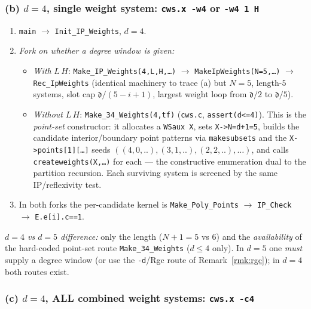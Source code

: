 \documentclass{amsart}
\begin{document}
\subsubsection*{(b) $d=4$, single weight system: \texttt{cws.x -w4} or \texttt{-w4 1 H}}

\begin{enumerate}
  \item \texttt{main} $\to$ \texttt{Init\_IP\_Weights}, $d=4$.
  \item \emph{Fork on whether a degree window is given:}
  \begin{itemize}
    \item \emph{With} $L\,H$: \texttt{Make\_IP\_Weights(4,L,H,\dots)} $\to$
          \texttt{MakeIpWeights(N=5,\dots)} $\to$ \texttt{Rec\_IpWeights}
          (identical machinery to trace (a) but $N=5$, length-$5$ systems,
          slot cap $\mathfrak d/(5-i+1)$, largest weight loop from
          $\mathfrak d/2$ to $\mathfrak d/5$).
    \item \emph{Without} $L\,H$: \texttt{Make\_34\_Weights(4,tf)}
          (\texttt{cws.c}, \texttt{assert(d<=4)}). This is the
          \emph{point-set} constructor: it allocates a \texttt{WSaux X},
          sets \texttt{X->N=d+1=5}, builds the candidate interior/boundary
          point patterns via \texttt{makesubsets} and the
          \texttt{X->points[1][\dots]} seeds $((4,0,..),(3,1,..),(2,2,..),\dots)$,
          and calls \texttt{createweights(X,\dots)} for each --- the
          constructive enumeration dual to the partition recursion. Each
          surviving system is screened by the same IP/reflexivity test.
  \end{itemize}
  \item In both forks the per-candidate kernel is \texttt{Make\_Poly\_Points}
        $\to$ \texttt{IP\_Check} $\to$ \texttt{E.e[i].c==1}.
\end{enumerate}
\emph{$d=4$ vs $d=5$ difference:} only the length ($N{+}1=5$ vs $6$) and the
\emph{availability} of the hard-coded point-set route \texttt{Make\_34\_Weights}
($d\le 4$ only). In $d=5$ one \emph{must} supply a degree window (or use the
\texttt{-d}/Rgc route of Remark~\ref{rmk:rgc}); in $d=4$ both routes exist.

\subsubsection*{(c) $d=4$, ALL combined weight systems: \texttt{cws.x -c4}}
\end{document}
